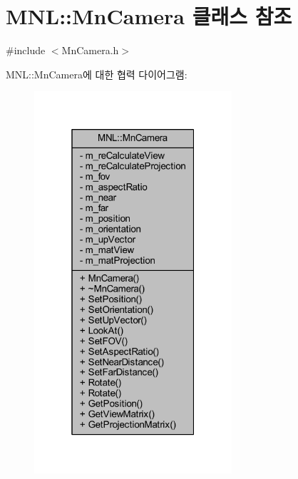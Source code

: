 \hypertarget{class_m_n_l_1_1_mn_camera}{}\section{M\+NL\+:\+:Mn\+Camera 클래스 참조}
\label{class_m_n_l_1_1_mn_camera}


{\ttfamily \#include $<$Mn\+Camera.\+h$>$}



M\+NL\+:\+:Mn\+Camera에 대한 협력 다이어그램\+:\nopagebreak
\begin{figure}[H]
\begin{center}
\leavevmode
\includegraphics[width=208pt]{class_m_n_l_1_1_mn_camera__coll__graph}
\end{center}
\end{figure}
